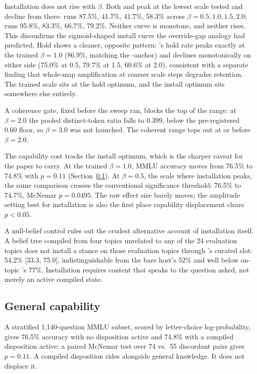 Installation does not rise with \(\beta\). Both \condC{} and \condF{} peak at the lowest
scale tested and decline from there: \condC{} runs 87.5\%, 41.7\%, 41.7\%, 58.3\% across
\(\beta = 0.5, 1.0, 1.5, 2.0\); \condF{} runs 95.8\%, 83.3\%, 66.7\%, 79.2\%. Neither
curve is monotone, and neither rises. This disconfirms the sigmoid-shaped install curve
the override-gap analogy had predicted. Hold shows a cleaner, opposite pattern:
\condF{}'s hold rate peaks exactly at the trained \(\beta = 1.0\) (86.9\%, matching the
\condF{}-anchor) and declines monotonically on either side (75.0\% at 0.5, 79.7\% at
1.5, 60.6\% at 2.0), consistent with a separate finding that whole-map amplification at
coarser scale steps degrades retention. The trained scale sits at the hold optimum, and
the install optimum sits somewhere else entirely.

A coherence gate, fixed before the sweep ran, blocks the top of the range: at
\(\beta = 2.0\) the pooled distinct-token ratio falls to 0.399, below the pre-registered
0.60 floor, so \(\beta = 3.0\) was not launched. The coherent range tops out at or
before \(\beta = 2.0\).

The capability cost tracks the install optimum, which is the sharper caveat for the
paper to carry. At the trained \(\beta = 1.0\), MMLU accuracy moves from 76.5\% to
74.8\% with \(p = 0.11\) (Section~\ref{sec:isolation-mmlu}). At \(\beta = 0.5\), the
scale where installation peaks, the same comparison crosses the conventional
significance threshold: 76.5\% to 74.7\%, McNemar \(p = 0.0495\). The raw effect size
barely moves; the amplitude setting best for installation is also the first place
capability displacement clears \(p < 0.05\).

A null-belief control rules out the crudest alternative account of installation
itself.
A belief tree compiled from four topics unrelated to any of the 24 evaluation topics
does not install a stance on those evaluation topics through \condF{}'s curated slot:
54.2\% [33.3, 75.0], indistinguishable from the bare host's 52\% and well below on-topic
\condF{}'s 77\%. Installation requires content that speaks to the question asked, not
merely an active compiled state.

\subsection{General capability}
\label{sec:isolation-mmlu}

A stratified 1,140-question MMLU subset, scored by letter-choice log-probability, gives
76.5\% accuracy with no disposition active and 74.8\% with a compiled disposition
active; a paired McNemar test over 74 vs.\ 55 discordant pairs gives \(p = 0.11\). A
compiled disposition rides alongside general knowledge. It does not displace it.
\fi

